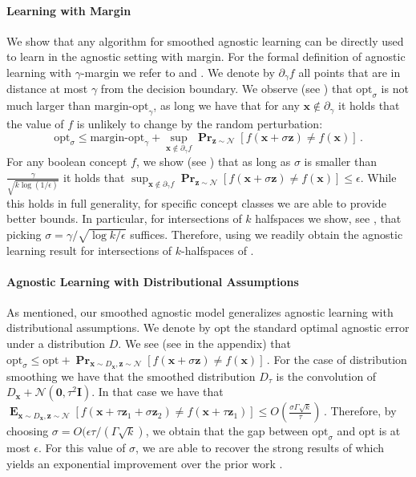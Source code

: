 \documentclass{theoretics}
\renewcommand\vec[1]{\mathbf{#1}}
\DeclareMathOperator*{\pr}{\mathbf{Pr}}
\DeclareMathOperator*{\E}{\mathbf{E}}
\newcommand{\normal}{\mathcal{N}}
\newcommand{\eps}{\epsilon}
\newcommand{\opt}{\mathrm{opt}}
\newcommand{\1}{\Ind}
\newcommand{\x}{\vec x}
\begin{document}
\paragraph{Learning with Margin}
We show that any algorithm
for smoothed agnostic learning can be directly used to learn in the agnostic setting with margin.
For the formal definition of agnostic learning with $\gamma$-margin we refer to 
and .
We denote by $\partial_\gamma f$ all points that are in distance at most $\gamma$ from the decision boundary.
We observe (see ) that $\opt_\sigma$ is not much larger than $\text{margin-opt}_\gamma$, as long we have that for any $\x\notin\partial_\gamma$ it holds that the value of $f$ is unlikely to change by the random perturbation:
\[
\opt_\sigma \leq \text{margin-opt}_\gamma + \sup_{\x \notin \partial_\gamma f} \pr_{\vec z \sim \normal}[f(\x + \sigma \vec z) \neq f(\x)] \,.
\]
For any boolean concept $f$, we show  (see ) that 
as long as $\sigma$ is smaller than $\frac{\gamma}{\sqrt{k \log({1}/{\eps})}}$ it holds that 
$\sup_{\x \notin \partial_\gamma f} \pr_{\vec z \sim \normal}[f(\x + \sigma \vec z) \neq f(\x)] \leq \eps$.
While this holds in full generality, for specific concept classes we are able to provide better bounds.
In particular, for intersections of $k$ halfspaces we show, see ,
that picking $\sigma = \gamma/\sqrt{\log k/\eps}$ suffices.  Therefore, using 
we readily obtain the agnostic learning result for intersections of $k$-halfspaces of .

\paragraph{Agnostic Learning with Distributional Assumptions}
As mentioned, our smoothed agnostic model generalizes agnostic learning with distributional assumptions.
We denote by $\opt$ the standard optimal agnostic error under a distribution $D$.  
We see (see  in the appendix) that 
\(
\opt_\sigma \leq \opt + \pr_{\x \sim D_\x, \vec z \sim \normal}[f(\x + \sigma \vec z) \neq f(\x)]\,.
\)
For the case of distribution smoothing we have that the smoothed distribution $D_\tau$  is the convolution of  $D_\x + \normal(\vec 0, \tau^2 \vec I)$.  In that case we have that 
$
\E_{\x \sim D_\x, \vec z \sim \normal }[f(\x + \tau \vec z_1 + \sigma \vec z_2) \neq f(\x+ \tau \vec z_1)] \leq 
O(\frac{\sigma \Gamma \sqrt{k}}{\tau}) \,.
$
Therefore, by choosing $\sigma = O(\eps \tau/(\Gamma \sqrt{k})$, we obtain that the gap between $\opt_{\sigma}$ and $\opt$
is at most $\eps$. For this value of $\sigma$, we are able to recover the strong results of  which yields an exponential improvement over the prior work \cite{Kane2013LearningHalfspacesLogConcave}.
\end{document}
